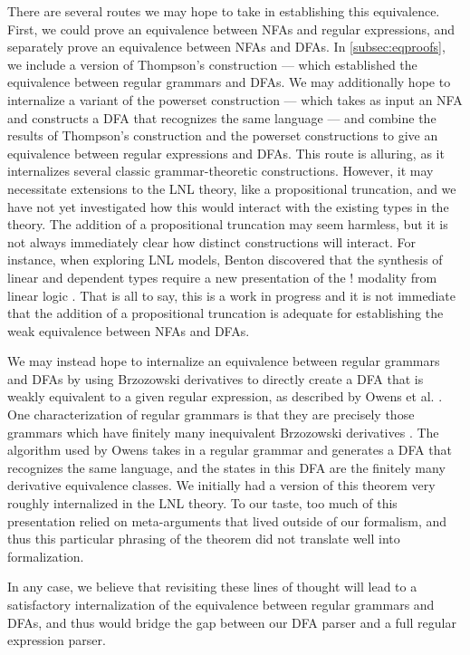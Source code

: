 \documentclass[acmsmall,screen,nonacm]{acmart}
\begin{document}
There are several routes we may hope to take in establishing
this equivalence. First, we could prove an equivalence
between NFAs and regular expressions, and separately prove
an equivalence between NFAs and DFAs.
In \cref{subsec:eqproofs}, we include a version of
Thompson's construction --- which established the
equivalence between regular grammars and DFAs. We may additionally
hope to internalize a variant of the powerset construction \cite{rabinFiniteAutomataTheir1959}
--- which takes as input an NFA and constructs a DFA that
recognizes the same language --- and combine the results of
Thompson's construction and the powerset constructions to give an equivalence
between regular expressions and DFAs.  This route is alluring, as it
internalizes several classic grammar-theoretic constructions. However, it may
necessitate extensions to the LNL theory, like
a propositional truncation, and we have not yet investigated
how this would interact with the existing types in the
theory. The addition of a propositional truncation may seem
harmless, but it is not always immediately clear how
distinct constructions will interact. For instance, when
exploring LNL models, Benton discovered that the synthesis
of linear and dependent types require a new presentation of
the $!$ modality from linear logic
\cite{bentonMixedLinearNonlinear1995}. That is all to say,
this is a work in progress and
it is not immediate that the addition of a propositional
truncation is adequate for establishing the weak equivalence
between NFAs and DFAs.

We may instead hope to internalize an equivalence between
regular grammars and DFAs by using Brzozowski derivatives to
directly create a DFA that is weakly equivalent to a given
regular expression, as described by Owens et al.
\cite{owensRegularexpressionDerivativesReexamined2009}.
One characterization of regular grammars is that they are
precisely those grammars which have finitely many inequivalent Brzozowski
derivatives
\cite{brzozowskiDerivativesRegularExpressions1964}.
The algorithm used by Owens takes in a
regular grammar and generates a DFA that recognizes the same
language, and the states in this DFA are the finitely many
derivative equivalence classes. We initially had a version of
this theorem very roughly internalized in the LNL theory.
To our taste, too much of this presentation relied on
meta-arguments that lived outside of
our formalism, and thus this particular phrasing of the
theorem did not translate well into formalization.

In any case, we believe
that revisiting these lines of thought will lead to a
satisfactory internalization of the equivalence between
regular grammars and DFAs, and thus would bridge the gap
between our DFA parser and a full regular expression parser.
\end{document}
